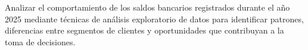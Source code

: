 Analizar el comportamiento de los saldos bancarios registrados durante el año 2025 mediante técnicas de análisis exploratorio de datos para identificar patrones, diferencias entre segmentos de clientes y oportunidades que contribuyan a la toma de decisiones.